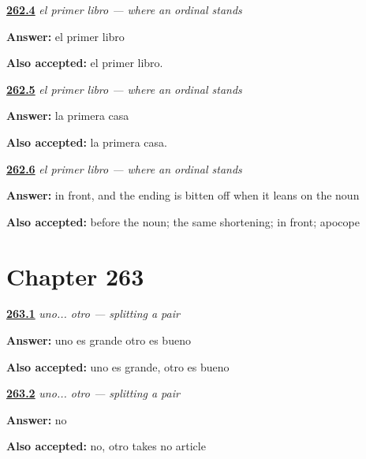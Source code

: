 \noindent\begin{minipage}[t]{\linewidth}
\raggedright
\hyperlink{review-ES-C67-primer-libro-first}{\textbf{262.4}} \emph{el primer libro — where an ordinal stands}\par
\small \textbf{Answer:} el primer libro\par
\footnotesize \textbf{Also accepted:} el primer libro.
\end{minipage}\par\medskip

\noindent\begin{minipage}[t]{\linewidth}
\raggedright
\hyperlink{review-ES-C67-primer-libro-fem}{\textbf{262.5}} \emph{el primer libro — where an ordinal stands}\par
\small \textbf{Answer:} la primera casa\par
\footnotesize \textbf{Also accepted:} la primera casa.
\end{minipage}\par\medskip

\noindent\begin{minipage}[t]{\linewidth}
\raggedright
\hyperlink{review-ES-C67-primer-libro-third}{\textbf{262.6}} \emph{el primer libro — where an ordinal stands}\par
\small \textbf{Answer:} in front, and the ending is bitten off when it leans on the noun\par
\footnotesize \textbf{Also accepted:} before the noun; the same shortening; in front; apocope
\end{minipage}\par\medskip

\section*{Chapter 263}

\noindent\begin{minipage}[t]{\linewidth}
\raggedright
\hyperlink{review-ES-C67-uno-otro-split}{\textbf{263.1}} \emph{uno... otro — splitting a pair}\par
\small \textbf{Answer:} uno es grande otro es bueno\par
\footnotesize \textbf{Also accepted:} uno es grande, otro es bueno
\end{minipage}\par\medskip

\noindent\begin{minipage}[t]{\linewidth}
\raggedright
\hyperlink{review-ES-C67-uno-otro-article}{\textbf{263.2}} \emph{uno... otro — splitting a pair}\par
\small \textbf{Answer:} no\par
\footnotesize \textbf{Also accepted:} no, otro takes no article
\end{minipage}\par\medskip

